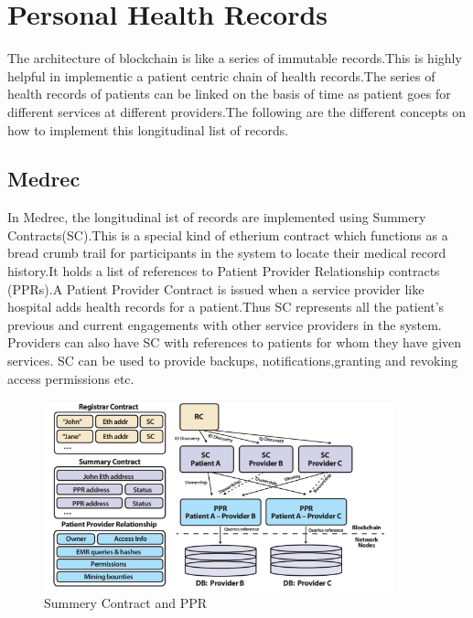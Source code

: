 \documentclass[12pt]{report}
\begin{document}
\section{Personal Health Records}
The architecture of blockchain is like a series of immutable records.This is highly helpful in implementic a patient centric chain of health records.The series of health records of patients can be linked on the basis of time as patient goes for different services at different providers.The following are the different concepts on how to implement this longitudinal list of records.
\subsection{Medrec\cite{2}}
In Medrec, the longitudinal ist of records are implemented using Summery Contracts(SC).This is a special kind of etherium contract which functions as a bread crumb trail for participants in the system to locate their medical record history.It holds a list of references to Patient Provider Relationship contracts (PPRs).A Patient Provider Contract is issued when a service provider like hospital adds health records for a patient.Thus SC represents all the patient's previous and current engagements with other service providers in the system. Providers can also have SC with references to patients for whom they have given services. SC can be used to provide backups, notifications,granting and revoking access permissions etc.
\begin{figure}[H]
\centering
\includegraphics[width=0.9\textwidth]{ppr.png}
\caption{Summery Contract and PPR}
\label{ppr}
\end{figure}
\end{document}
